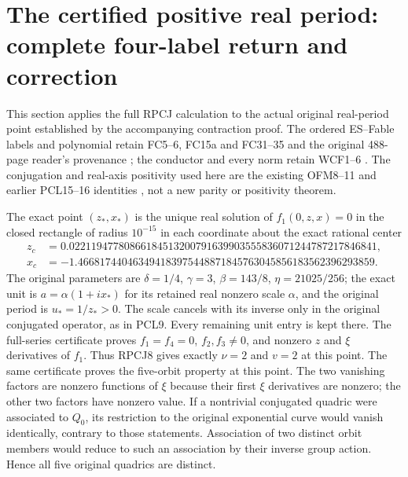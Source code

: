 \section{The certified positive real period: complete four-label return and correction}
This section applies the full RPCJ calculation to the actual original
real-period point established by the accompanying contraction proof.
The ordered ES--Fable labels and polynomial retain FC5--6, FC15a and
FC31--35 and the original 488-page reader's provenance
\cite{ES488,Cumulative}; the conductor and every norm retain WCF1--6
\cite{WCF}. The conjugation and real-axis positivity used here are
the existing OFM8--11 and earlier PCL15--16 identities
\cite{PCLOriginal,Cumulative}, not a new parity or positivity theorem.

The exact point $(z_*,x_*)$ is the unique real solution of
$f_1(0,z,x)=0$ in the closed rectangle of radius $10^{-15}$ in
each coordinate about the exact rational center
\[
 \begin{split}
 z_c&=0.02211947780866184513200791639903555836071244787217846841,\\
 x_c&=-1.466817440463494183975448871845763045856183562396293859.
 \end{split}\tag{RPE1}
\]
The original parameters are
$\delta=1/4$, $\gamma=3$, $\beta=143/8$, $\eta=21025/256$;
the exact unit is $a=\alpha(1+ix_*)$ for its retained real nonzero
scale $\alpha$, and the original period is $u_*=1/z_*>0$.
The scale cancels with its inverse only in the original conjugated
operator, as in PCL9. Every remaining unit entry is kept there.
The full-series certificate proves $f_1=f_4=0$,
$f_2,f_3\ne0$, and nonzero $z$ and $\xi$ derivatives of $f_1$.
Thus RPCJ8 gives exactly $\nu=2$ and $v=2$ at this point.
The same certificate proves the five-orbit property at this point.
The two vanishing factors are nonzero functions of $\xi$ because
their first $\xi$ derivatives are nonzero; the other two factors
have nonzero value. If a nontrivial conjugated quadric were associated
to $Q_0$, its restriction to the original exponential curve would
vanish identically, contrary to those statements. Association of two
distinct orbit members would reduce to such an association by their
inverse group action. Hence all five original quadrics are distinct.

